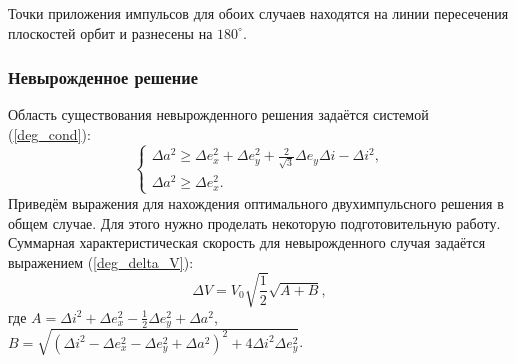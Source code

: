 \documentclass[12pt,a4paper]{extarticle}
\begin{document}
Точки приложения импульсов для обоих случаев находятся на линии пересечения плоскостей орбит и разнесены на $180^{\circ}$.

\subsubsection{Невырожденное решение}
Область существования невырожденного решения задаётся системой (\ref{deg_cond}):
\begin{equation}
\begin{cases}
    \Delta a^2 \geq \Delta e_x^2 + \Delta e_y^2 + \frac{2}{\sqrt{3}} \Delta e_y \Delta i - \Delta i^2, \\
    \Delta a^2 \geq \Delta e_x^2.
\end{cases}
\label{deg_cond}
\end{equation}
Приведём выражения для нахождения оптимального двухимпульсного решения в общем случае. Для этого нужно проделать некоторую подготовительную работу. Суммарная характеристическая скорость для невырожденного случая задаётся выражением (\ref{deg_delta_V}):
\begin{equation}
    \Delta V = V_0 \sqrt{\frac{1}{2}} \sqrt{A + B},
\label{deg_delta_V}
\end{equation}
где $A = \Delta i^2 + \Delta e_x^2 - \frac{1}{2} \Delta e_y^2 + \Delta a^2$, $B = \sqrt{(\Delta i^2 - \Delta e_x^2 - \Delta e_y^2 + \Delta a^2)^2 + 4 \Delta i^2 \Delta e_y^2}$.
\end{document}
